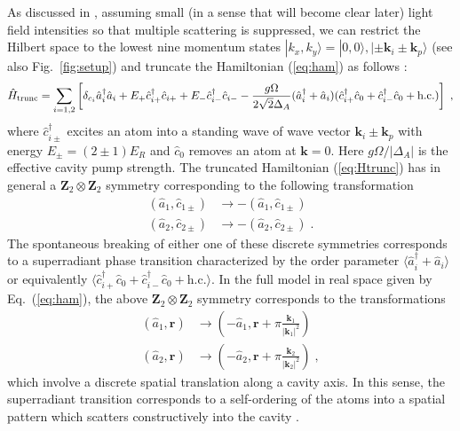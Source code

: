 \documentclass[12pt]{iopart}
\begin{document}
As discussed in \cite{leonard2016supersolid}, assuming
small (in a sense that will become clear later) light
field intensities so that multiple scattering is suppressed, we can
restrict the Hilbert space to the lowest nine momentum states
$|k_x,k_y\rangle=|0,0\rangle,|\pm\mathbf{k}_i\pm\mathbf{k}_p\rangle$
(see also Fig.~\ref{fig:setup})
and truncate the Hamiltonian (\ref{eq:ham}) as follows
\cite{leonard2016supersolid}:
\begin{align}
\label{eq:Htrunc}
\hat{H}_{\rm trunc}=\sum_{i=1,2}\left[\delta_{c_i}\hat{a}_i^\dag \hat{a}_i+E_+\hat{c}_{i+}^\dag \hat{c}_{i+}+E_-\hat{c}_{i-}^\dag \hat{c}_{i-}-\frac{g\Omega}{2\sqrt{2}\Delta_A}(\hat{a}_i^\dag+\hat{a}_i)(\hat{c}_{i+}^\dag\hat{c}_0+\hat{c}_{i-}^\dag\hat{c}_0+\text{h.c.})\right]\;,
\end{align}
where $\hat{c}_{i\pm}^\dag$ excites an atom into a standing wave of
wave vector $\mathbf{k}_i\pm\mathbf{k}_p$ with energy
$E_{\pm}=(2\pm1)E_R$ and $\hat{c}_0$ removes an atom at $\mathbf{k}=0$. Here
$g\Omega/|\Delta_A|$ is the effective cavity pump strength.
The truncated Hamiltonian (\ref{eq:Htrunc}) has in general a
$\mathbf{Z}_2\otimes \mathbf{Z}_2$ symmetry corresponding to the following transformation
\begin{align}
\label{eq:Z2trafo_trunc}
(\hat{a}_1,\hat{c}_{1\pm})&\to-(\hat{a}_1,\hat{c}_{1\pm})\\
(\hat{a}_2,\hat{c}_{2\pm})&\to-(\hat{a}_2,\hat{c}_{2\pm})\;.
\end{align}
The spontaneous breaking of either one of these discrete symmetries corresponds to a
superradiant phase transition characterized by the order parameter
$\langle\hat{a}_i^\dag+\hat{a}_i\rangle$ or equivalently
$\langle \hat{c}_{i+}^\dag\hat{c}_0+\hat{c}_{i-}^\dag\hat{c}_0+\text{h.c.}\rangle$. In the full
model in real space given by Eq.~(\ref{eq:ham}), the above
$\mathbf{Z}_2\otimes \mathbf{Z}_2$ symmetry corresponds to the transformations
\begin{align}
\label{eq:Z2trafo}
(\hat{a}_1,\mathbf{r})&\to(-\hat{a}_1, \mathbf{r}+\pi\frac{\mathbf{k}_1}{|\mathbf{k}_1|^2})\\
(\hat{a}_2,\mathbf{r})&\to(-\hat{a}_2, \mathbf{r}+\pi\frac{\mathbf{k}_2}{|\mathbf{k}_2|^2})\;,
\end{align}
which involve a discrete spatial translation along a cavity axis. In
this sense, the superradiant transition corresponds to a self-ordering
of the atoms into a spatial pattern which scatters constructively into
the cavity \cite{cavity_rmp}. 
\end{document}
